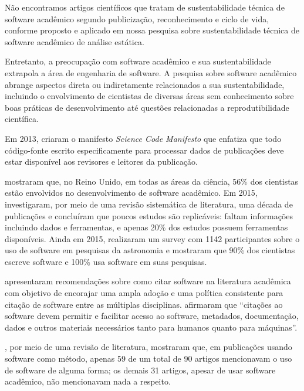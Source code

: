 Não encontramos artigos científicos que tratam de sustentabilidade técnica
de software acadêmico segundo publicização, reconhecimento e ciclo de vida,
conforme proposto e aplicado em nossa pesquisa sobre sustentabilidade
técnica de software acadêmico de análise estática.

Entretanto, a preocupação com software acadêmico e sua sustentabilidade
extrapola a área de engenharia de software.
A pesquisa sobre software acadêmico abrange aspectos 
direta ou indiretamente relacionados a sua sustentabilidade,
incluindo o envolvimento de cientistas de diversas áreas sem conhecimento
sobre boas práticas de desenvolvimento até 
questões relacionadas a reprodutibilidade científica.

Em 2013, 
criaram o manifesto {\it Science Code Manifesto} que enfatiza que todo código-fonte
escrito especificamente para processar dados de publicações deve estar
disponível aos revisores e leitores da publicação.

 mostraram que, no Reino Unido, em todas as áreas da
ciência, 56\% dos cientistas estão envolvidos no desenvolvimento de software
acadêmico. 
Em 2015, 
investigaram, por meio de uma revisão sistemática de literatura, uma década de
publicações e concluíram que poucos estudos são replicáveis:
faltam informações incluindo dados e ferramentas, e apenas 20\% dos estudos
possuem ferramentas disponíveis.
Ainda em 2015,  realizaram
um survey com 1142 participantes sobre o uso de software em pesquisas da
astronomia e mostraram que 90\% dos cientistas escreve software e 100\% usa
software em suas pesquisas.

 apresentaram recomendações sobre como citar software
na literatura acadêmica com objetivo de encorajar uma ampla adoção e uma
política consistente para citação de software entre as múltiplas disciplinas.
%
 afirmaram que ``citações ao software devem
permitir e facilitar acesso ao software, metadados, documentação, dados e
outros materiais necessários tanto para humanos quanto para máquinas''.

,
por meio de uma  revisão de literatura, mostraram que,
em  publicações usando software como
método, apenas 59 de um total de 90 artigos mencionavam o uso de software de alguma forma;
os demais 31 artigos, apesar de usar software acadêmico, não mencionavam nada a
respeito.

